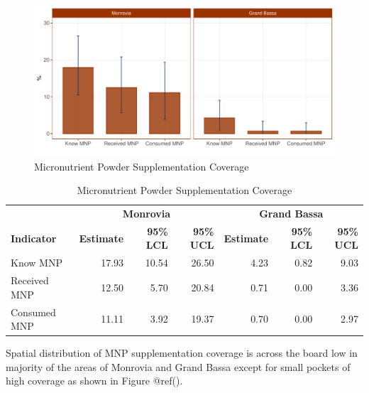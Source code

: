 \documentclass[12pt,a4paper]{article}
\begin{document}
\begin{figure}[H]

{\centering \includegraphics{liberiaCoverageReport_files/figure-latex/mnp1-1} 

}

\caption{Micronutrient Powder Supplementation Coverage}\label{fig:mnp1}
\end{figure}

\begin{table}[H]

\caption{\label{tab:mnp2}Micronutrient Powder Supplementation Coverage}
\centering
\fontsize{10}{12}\selectfont
\begin{tabular}[t]{lrrrrrr}
\toprule
\multicolumn{1}{c}{\textbf{ }} & \multicolumn{3}{c}{\textbf{Monrovia}} & \multicolumn{3}{c}{\textbf{Grand Bassa}} \\
\cmidrule(l{3pt}r{3pt}){2-4} \cmidrule(l{3pt}r{3pt}){5-7}
\textbf{Indicator} & \textbf{Estimate} & \textbf{95\% LCL} & \textbf{95\% UCL} & \textbf{Estimate} & \textbf{95\% LCL} & \textbf{95\% UCL}\\
\midrule
\rowcolor{gray!6}  Know MNP & 17.93 & 10.54 & 26.50 & 4.23 & 0.82 & 9.03\\
Received MNP & 12.50 & 5.70 & 20.84 & 0.71 & 0.00 & 3.36\\
\rowcolor{gray!6}  Consumed MNP & 11.11 & 3.92 & 19.37 & 0.70 & 0.00 & 2.97\\
\bottomrule
\end{tabular}
\end{table}

Spatial distribution of MNP supplementation coverage is across the board low in majority of the areas of Monrovia and Grand Bassa except for small pockets of high coverage as shown in Figure @ref(\citet{mnpMap}).
\end{document}
